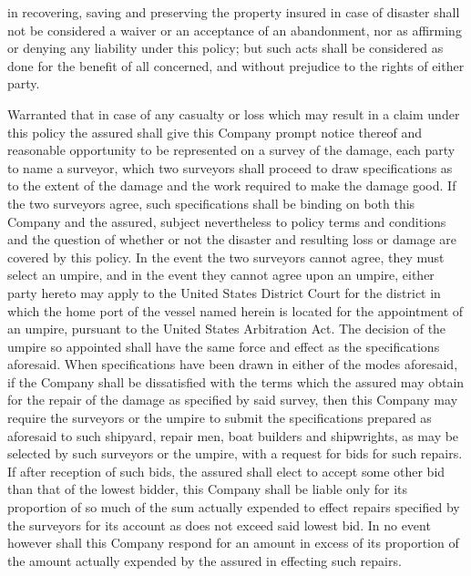 \documentclass[10pt]{article}
\begin{document}
\begin{linenumbers}
in   recovering, saving  and  preserving  the  property  insured  in  case  of  disaster  shall  not  be  considered  a  waiver  or  an  acceptance of an abandonment, nor as affirming or denying any liability under this policy; but such acts shall be considered as done for the benefit of all concerned, and without prejudice to the rights of either party.

Warranted  that  in  case  of  any  casualty  or  loss  which  may  result  in  a  claim  under  this  policy  the  assured  shall give  this  Company  prompt  notice  thereof  and  reasonable  opportunity  to  be  represented  on  a  survey  of  the  damage, each  party  to  name  a  surveyor,  which  two  surveyors  shall  proceed  to  draw  specifications  as  to  the  extent  of  the damage  and  the  work  required  to  make  the  damage  good.  If  the  two  surveyors  agree,  such  specifications  shall  be binding  on  both  this  Company  and  the  assured,  subject  nevertheless  to  policy  terms  and  conditions  and  the  question of  whether  or  not  the  disaster  and  resulting  loss  or  damage  are  covered  by  this  policy.  In  the  event  the  two  surveyors cannot  agree,  they  must  select  an  umpire,  and  in  the  event  they  cannot  agree  upon  an  umpire,  either  party hereto  may  apply  to  the  United  States  District  Court  for  the  district  in  which  the  home  port  of  the  vessel  named herein  is  located  for  the  appointment  of  an  umpire,  pursuant  to  the  United  States  Arbitration  Act.  The  decision  of the  umpire  so  appointed  shall  have  the  same  force  and  effect  as  the  specifications  aforesaid.  When  specifications have  been  drawn  in  either  of  the  modes  aforesaid,  if  the  Company  shall  be  dissatisfied  with  the  terms  which  the assured  may  obtain  for  the  repair  of  the  damage  as  specified  by  said  survey,  then  this  Company  may  require  the surveyors  or  the  umpire  to  submit  the  specifications  prepared  as  aforesaid  to  such  shipyard,  repair  men,  boat  builders and  shipwrights,  as  may  be  selected  by  such  surveyors  or  the  umpire,  with  a  request  for  bids  for  such  repairs. If  after  reception  of  such  bids,  the  assured  shall  elect  to  accept  some  other  bid  than  that  of  the  lowest  bidder,  this Company   shall   be   liable   only   for   its   proportion   of   so   much   of   the   sum   actually   expended   to   effect   repairs specified  by  the  surveyors   for  its  account  as  does  not  exceed  said  lowest  bid.  In  no  event  however  shall  this Company  respond  for  an  amount  in  excess  of  its  proportion  of  the  amount  actually  expended  by  the  assured  in effecting such repairs.


\end{linenumbers}
\end{document}
